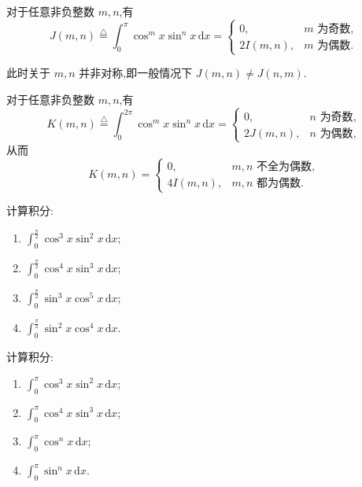 \documentclass[../数学分析培优讲义.tex]{subfiles}
\begin{document}
\begin{proposition}[\markstar]
对于任意非负整数 $m,n$,有
\[
    J(m,n)\overset{\triangle}{=}
    \int_0^\pi\cos^m x\sin^n x\,\mathrm{d}x
    =\begin{cases}
        0,&m\text{ 为奇数},\\
        2I(m,n),&m\text{ 为偶数}.
    \end{cases}
\]
\end{proposition}

\begin{remark}
此时关于 $m,n$ 并非对称,即一般情况下 $J(m,n)\neq J(n,m)$.
\end{remark}

\begin{proposition}[\markstar]
对于任意非负整数 $m,n$,有
\[
    K(m,n)\overset{\triangle}{=}
    \int_0^{2\pi}\cos^m x\sin^n x\,\mathrm{d}x
    =\begin{cases}
        0,&n\text{ 为奇数},\\
        2J(m,n),&n\text{ 为偶数},
    \end{cases}
\]
从而
\[
    K(m,n)=\begin{cases}
        0,&m,n\text{ 不全为偶数},\\
        4I(m,n),&m,n\text{ 都为偶数}.
    \end{cases}
\]
\end{proposition}

\begin{example}
计算积分:
\begin{enumerate}[label=(\arabic*)]
    \item $\displaystyle\int_0^{\frac{\pi}{2}}\cos^3x\sin^2x\,\mathrm{d}x$;
    \item $\displaystyle\int_0^{\frac{\pi}{2}}\cos^4x\sin^3x\,\mathrm{d}x$;
    \item $\displaystyle\int_0^{\frac{\pi}{2}}\sin^3x\cos^5x\,\mathrm{d}x$;
    \item $\displaystyle\int_0^{\frac{\pi}{2}}\sin^2x\cos^4x\,\mathrm{d}x$.
\end{enumerate}
\end{example}
\exampleblank

\begin{example}
计算积分:
\begin{enumerate}[label=(\arabic*)]
    \item $\displaystyle\int_0^\pi\cos^3x\sin^2x\,\mathrm{d}x$;
    \item $\displaystyle\int_0^\pi\cos^4x\sin^3x\,\mathrm{d}x$;
    \item $\displaystyle\int_0^\pi\cos^n x\,\mathrm{d}x$;
    \item $\displaystyle\int_0^\pi\sin^n x\,\mathrm{d}x$.
\end{enumerate}
\end{example}
\exampleblank
\end{document}
